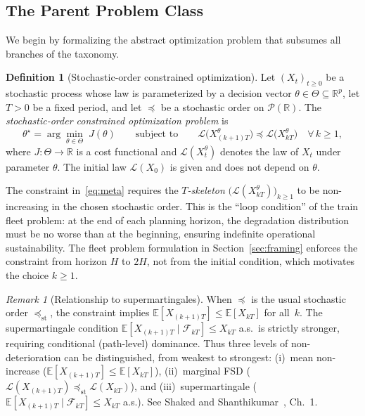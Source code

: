 \documentclass[11pt,a4paper]{article}
\theoremstyle{plain}
\theoremstyle{definition}
\newtheorem{definition}[theorem]{Definition}
\theoremstyle{remark}
\newtheorem{remark}[theorem]{Remark}
\begin{document}
\subsection{The Parent Problem Class}
\label{sec:macro:parent}

We begin by formalizing the abstract optimization problem that
subsumes all branches of the taxonomy.

\begin{definition}[Stochastic-order constrained optimization]
\label{def:meta}
Let $(X_t)_{t \ge 0}$ be a stochastic process whose law is parameterized
by a decision vector $\theta \in \Theta \subseteq \mathbb{R}^p$, let
$T > 0$ be a fixed period, and let $\preceq$ be a stochastic order on
$\mathcal{P}(\mathbb{R})$.  The \emph{stochastic-order constrained
optimization problem} is
\begin{equation}\label{eq:meta}
  \theta^{\star} = \arg\min_{\theta \in \Theta}\; J(\theta)
  \qquad\text{subject to}\qquad
  \mathcal{L}\!\bigl(X_{(k+1)T}^{\theta}\bigr)
    \preceq \mathcal{L}\!\bigl(X_{kT}^{\theta}\bigr)
  \quad \forall\, k \ge 1,
\end{equation}
where $J : \Theta \to \mathbb{R}$ is a cost functional and
$\mathcal{L}(X_t^\theta)$ denotes the law of $X_t$ under parameter
$\theta$.  The initial law $\mathcal{L}(X_0)$ is given and does not
depend on $\theta$.
\end{definition}

The constraint in~\eqref{eq:meta} requires the \emph{$T$-skeleton}
$\bigl(\mathcal{L}(X_{kT}^{\theta})\bigr)_{k \ge 1}$ to be
non-increasing in the chosen stochastic order.  This is the ``loop
condition'' of the train fleet problem: at the end of each planning
horizon, the degradation distribution must be no worse than at the
beginning, ensuring indefinite operational sustainability.
The fleet problem formulation in Section~\ref{sec:framing}
enforces the constraint from horizon $H$ to $2H$, not from the
initial condition, which motivates the choice $k \ge 1$.

\begin{remark}[Relationship to supermartingales]
\label{rem:supermartingale}
When $\preceq$ is the usual stochastic order $\preceq_{\mathrm{st}}$,
the constraint implies $\mathbb{E}[X_{(k+1)T}] \le \mathbb{E}[X_{kT}]$
for all~$k$.  The supermartingale condition
$\mathbb{E}[X_{(k+1)T} \mid \mathcal{F}_{kT}] \le X_{kT}$ a.s.\ is
strictly stronger, requiring conditional (path-level) dominance.
Thus three levels of non-deterioration can be distinguished, from
weakest to strongest: (i)~mean non-increase
($\mathbb{E}[X_{(k+1)T}] \le \mathbb{E}[X_{kT}]$), (ii)~marginal FSD
($\mathcal{L}(X_{(k+1)T}) \preceq_{\mathrm{st}}
\mathcal{L}(X_{kT})$), and (iii)~supermartingale
($\mathbb{E}[X_{(k+1)T} \mid \mathcal{F}_{kT}] \le X_{kT}$ a.s.).
See Shaked and Shanthikumar~\cite{shaked2007}, Ch.~1.
\end{remark}
\end{document}
